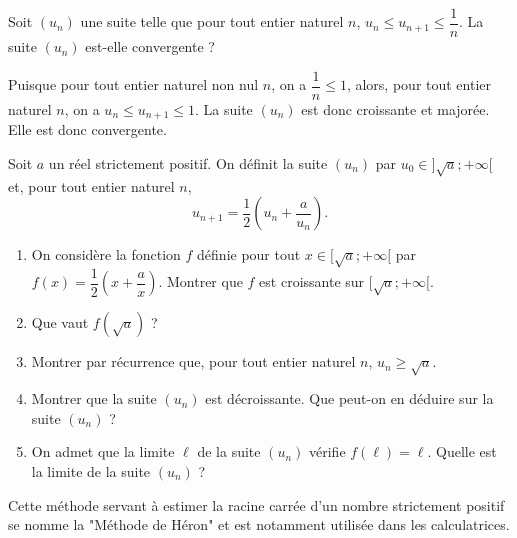 \documentclass[11pt,fleqn, openany]{book} %
\begin{document}
\begin{exercise}[subtitle={(Métropole 2022)}]Soit $(u_n)$ une suite telle que pour tout entier naturel $n$, $u_n \leqslant u_{n+1} \leqslant \dfrac{1}{n}$. La suite $(u_n)$ est-elle convergente ?\end{exercise}

\begin{solution}Puisque pour tout entier naturel non nul $n$, on a $\dfrac{1}{n}\leqslant 1$, alors, pour tout entier naturel $n$, on a $u_n\leqslant u_{n+1} \leqslant 1$. La suite $(u_n)$ est donc croissante et majorée. Elle est donc convergente.\end{solution}





\begin{exercise}

Soit $a$ un réel strictement positif. On définit la suite $(u_n)$ par $u_0\in ]\sqrt{a};+\infty[$ et, pour tout entier naturel $n$,
\[u_{n+1}=\dfrac{1}{2}\left(u_n+\dfrac{a}{u_n}\right).\]
\begin{enumerate}
\item On considère la fonction $f$ définie pour tout $x\in [ \sqrt{a};+\infty[$ par $f(x)=\dfrac{1}{2}\left( x+\dfrac{a}{x}\right)$. Montrer que $f$ est croissante sur $ [ \sqrt{a};+\infty[$.
\item Que vaut $f(\sqrt{a})$ ?
\item Montrer par récurrence que, pour tout entier naturel $n$, $u_n\geqslant \sqrt{a}$.
\item Montrer que la suite $(u_n)$ est décroissante. Que peut-on en déduire sur la suite $(u_n)$ ? 
\item On admet que la limite $\ell$ de la suite $(u_n)$ vérifie $f(\ell)=\ell$. Quelle est la limite de la suite $(u_n)$ ?
\end{enumerate}
Cette méthode servant à estimer la racine carrée d'un nombre strictement positif se nomme la "Méthode de Héron" et est notamment utilisée dans les calculatrices.\end{exercise}
\end{document}
